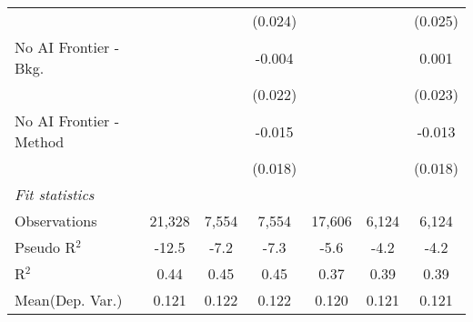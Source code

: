 \begin{tabular}{lcccccc}
                           &              &         & (0.024)      &              &         & (0.025)\\   
   No AI Frontier - Bkg.   &              &         & -0.004       &              &         & 0.001\\   
                           &              &         & (0.022)      &              &         & (0.023)\\   
   No AI Frontier - Method &              &         & -0.015       &              &         & -0.013\\   
                           &              &         & (0.018)      &              &         & (0.018)\\   
   \midrule
   \emph{Fit statistics}\\
   Observations            & 21,328       & 7,554   & 7,554        & 17,606       & 6,124   & 6,124\\  
   Pseudo R$^2$            & -12.5        & -7.2    & -7.3         & -5.6         & -4.2    & -4.2\\  
   R$^2$                   & 0.44         & 0.45    & 0.45         & 0.37         & 0.39    & 0.39\\  
Mean(Dep. Var.) & 0.121 & 0.122 & 0.122 & 0.120 & 0.121 & 0.121 \\
   

\end{tabular}
